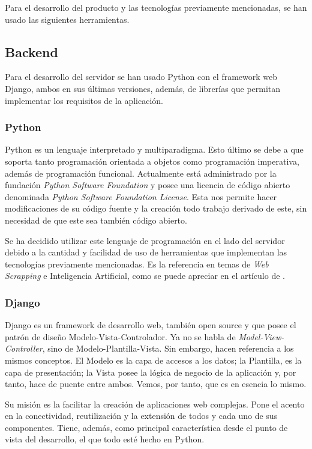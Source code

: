 Para el desarrollo del producto y las tecnologías previamente mencionadas, se han usado las siguientes herramientas.

\subsection{Backend}
Para el desarrollo del servidor se han usado Python con el framework web Django, ambos en sus últimas versiones, además, de librerías que permitan implementar los requisitos de la aplicación.

\subsubsection{Python}
Python es un lenguaje interpretado y multiparadigma. Esto último se debe a que soporta tanto programación orientada a objetos como programación imperativa, además de programación funcional. Actualmente está administrado por la fundación \textit{Python Software Foundation} y posee una licencia de código abierto denominada \textit{Python Software Foundation License}. Esta nos permite hacer modificaciones de su código fuente y la creación todo trabajo derivado de este, sin necesidad de que este sea también código abierto.

Se ha decidido utilizar este lenguaje de programación en el lado del servidor debido a la cantidad y facilidad de uso de herramientas que implementan las tecnologías previamente mencionadas. Es la referencia en temas de \textit{Web Scrapping} e Inteligencia Artificial, como se puede apreciar en el artículo de .

\subsubsection{Django}
Django es un framework de desarrollo web, también open source y que posee el patrón de diseño Modelo-Vista-Controlador. Ya no se habla de \textit{Model-View-Controller}, sino de Modelo-Plantilla-Vista. Sin embargo, hacen referencia a los mismos conceptos. El Modelo es la capa de accesos a los datos; la Plantilla, es la capa de presentación; la Vista posee la lógica de negocio de la aplicación y, por tanto, hace de puente entre ambos. Vemos, por tanto, que es en esencia lo mismo.

Su misión es la facilitar la creación de aplicaciones web complejas. Pone el acento en la conectividad, reutilización y la extensión de todos y cada uno de sus componentes. Tiene, además, como principal característica desde el punto de vista del desarrollo, el que todo esté hecho en Python.

